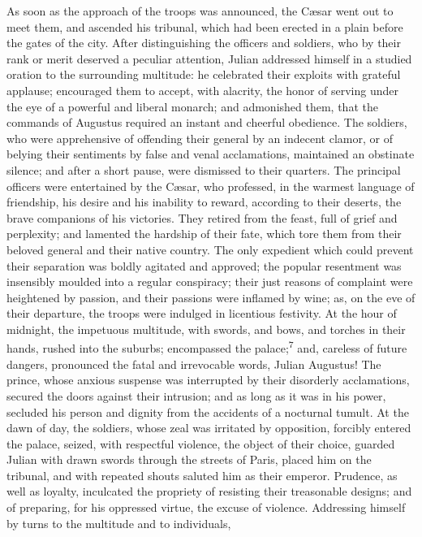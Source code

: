 As soon as the approach of the troops was announced, the Cæsar
went out to meet them, and ascended his tribunal, which had been
erected in a plain before the gates of the city. After
distinguishing the officers and soldiers, who by their rank or
merit deserved a peculiar attention, Julian addressed himself in
a studied oration to the surrounding multitude: he celebrated
their exploits with grateful applause; encouraged them to accept,
with alacrity, the honor of serving under the eye of a powerful
and liberal monarch; and admonished them, that the commands of
Augustus required an instant and cheerful obedience. The
soldiers, who were apprehensive of offending their general by an
indecent clamor, or of belying their sentiments by false and
venal acclamations, maintained an obstinate silence; and after a
short pause, were dismissed to their quarters. The principal
officers were entertained by the Cæsar, who professed, in the
warmest language of friendship, his desire and his inability to
reward, according to their deserts, the brave companions of his
victories. They retired from the feast, full of grief and
perplexity; and lamented the hardship of their fate, which tore
them from their beloved general and their native country. The
only expedient which could prevent their separation was boldly
agitated and approved; the popular resentment was insensibly
moulded into a regular conspiracy; their just reasons of
complaint were heightened by passion, and their passions were
inflamed by wine; as, on the eve of their departure, the troops
were indulged in licentious festivity. At the hour of midnight,
the impetuous multitude, with swords, and bows, and torches in
their hands, rushed into the suburbs; encompassed the palace;\textsuperscript{7}
and, careless of future dangers, pronounced the fatal and
irrevocable words, Julian Augustus! The prince, whose anxious
suspense was interrupted by their disorderly acclamations,
secured the doors against their intrusion; and as long as it was
in his power, secluded his person and dignity from the accidents
of a nocturnal tumult. At the dawn of day, the soldiers, whose
zeal was irritated by opposition, forcibly entered the palace,
seized, with respectful violence, the object of their choice,
guarded Julian with drawn swords through the streets of Paris,
placed him on the tribunal, and with repeated shouts saluted him
as their emperor. Prudence, as well as loyalty, inculcated the
propriety of resisting their treasonable designs; and of
preparing, for his oppressed virtue, the excuse of violence.
Addressing himself by turns to the multitude and to individuals,
